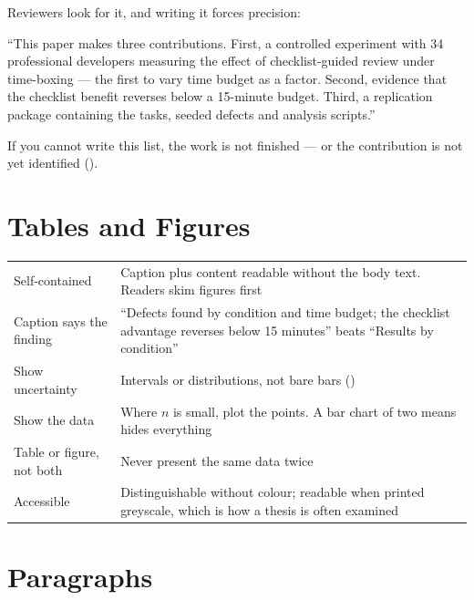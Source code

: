 \begin{conceptbox}
Reviewers look for it, and writing it forces precision:

\medskip
``This paper makes three contributions. First, a controlled experiment with 34
professional developers measuring the effect of checklist-guided review under
time-boxing --- the first to vary time budget as a factor. Second, evidence
that the checklist benefit reverses below a 15-minute budget. Third, a
replication package containing the tasks, seeded defects and analysis scripts.''

\medskip
If you cannot write this list, the work is not finished --- or the contribution
is not yet identified ().
\end{conceptbox}

\section{Tables and Figures}

\begin{center}
\small
\begin{tabular}{@{}L{3.4cm}L{10.9cm}@{}}
\toprule
Self-contained     & Caption plus content readable without the body text.
                     Readers skim figures first \\
Caption says the finding & ``Defects found by condition and time budget; the
                     checklist advantage reverses below 15 minutes'' beats
                     ``Results by condition'' \\
Show uncertainty   & Intervals or distributions, not bare bars
                     () \\
Show the data      & Where $n$ is small, plot the points. A bar chart of two
                     means hides everything \\
Table or figure, not both & Never present the same data twice \\
Accessible         & Distinguishable without colour; readable when printed
                     greyscale, which is how a thesis is often examined \\
\bottomrule
\end{tabular}
\end{center}

\section{Paragraphs}

